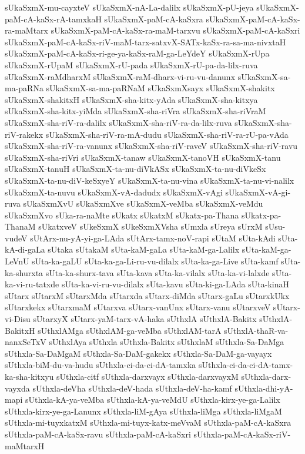 {sUkaSxmX-mu-cayxteV
sUkaSxmX-nA-La-dalilx
sUkaSxmX-pU-jeya
sUkaSxmX-paM-cA-kaSx-rA-tamxkaH
sUkaSxmX-paM-cA-kaSxra
sUkaSxmX-paM-cA-kaSx-ra-maMtarx
sUkaSxmX-paM-cA-kaSx-ra-maM-tarxvu
sUkaSxmX-paM-cA-kaSxri
sUkaSxmX-paM-cA-kaSx-riV-maM-tarx-satxvX-SATx-kaSx-ra-sa-ma-nivxtaH
sUkaSxmX-paM-cA-kaSx-ri-ge-ya-kaSx-raM-ga-LeYdeY
sUkaSxmX-rUpa
sUkaSxmX-rUpaM
sUkaSxmX-rU-pada
sUkaSxmX-rU-pa-da-lilx-ruva
sUkaSxmX-raMdharxM
sUkaSxmX-raM-dharx-vi-ru-vu-danunx
sUkaSxmX-sa-ma-paRNa
sUkaSxmX-sa-ma-paRNaM
sUkaSxmXsayx
sUkaSxmX-shakitx
sUkaSxmX-shakitxH
sUkaSxmX-sha-kitx-yAda
sUkaSxmX-sha-kitxya
sUkaSxmX-sha-kitx-yiMda
sUkaSxmX-sha-riVra
sUkaSxmX-sha-riVraM
sUkaSxmX-sha-riV-ra-dalilx
sUkaSxmX-sha-riV-ra-da-lilx-ruva
sUkaSxmX-sha-riV-rakekx
sUkaSxmX-sha-riV-ra-mA-dudu
sUkaSxmX-sha-riV-ra-rU-pa-vAda
sUkaSxmX-sha-riV-ra-vanunx
sUkaSxmX-sha-riV-raveV
sUkaSxmX-sha-riV-ravu
sUkaSxmX-sha-riVri
sUkaSxmX-tanaw
sUkaSxmX-tanoVH
sUkaSxmX-tanu
sUkaSxmX-tanuH
sUkaSxmX-ta-nu-diVkASx
sUkaSxmX-ta-nu-diVkeSx
sUkaSxmX-ta-nu-diV-keSxyeY
sUkaSxmX-ta-nu-vina
sUkaSxmX-ta-nu-vi-nalilx
sUkaSxmX-ta-nuvu
sUkaSxmX-vA-dadudx
sUkaSxmX-vAgi
sUkaSxmX-vA-gi-ruva
sUkaSxmXvU
sUkaSxmXve
sUkaSxmX-veMba
sUkaSxmX-veMdu
sUkaSxmXvo
sUka-ra-naMte
sUkatx
sUkatxM
sUkatx-pa-Thana
sUkatx-pa-ThanaM
sUkatxveV
sUkeSxmX
sUkeSxmXVsha
sUmxla
sUreya
sUrxM
sUsu-vudeV
sUtArx-nu-yA-yi-ga-LAda
sUtArx-tamx-noV-rapi
sUtaM
sUta-kAdi
sUta-kA-di-gaLa
sUtaka
sUtakaM
sUta-kaM-gaLa
sUta-kaM-ga-Lalilx
sUta-kaM-ga-LeVnU
sUta-ka-gaLU
sUta-ka-ga-Li-ru-vu-dilalx
sUta-ka-ga-Live
sUta-kamf
sUta-ka-shurxta
sUta-ka-shurx-tava
sUta-kava
sUta-ka-vilalx
sUta-ka-vi-lalxde
sUta-ka-vi-ru-tatxde
sUta-ka-vi-ru-vu-dilalx
sUta-kavu
sUta-ki-ga-LAda
sUta-kinaH
sUtarx
sUtarxM
sUtarxMda
sUtarxda
sUtarx-diMda
sUtarx-gaLu
sUtarxkUkx
sUtarxkekx
sUtarxmaM
sUtarxva
sUtarx-vanUnx
sUtarx-vanu
sUtarxveV
sUtarx-vi-Disu
sUtarxyX
sUtarx-yaM-tarx-vA-haka
sUthxlA
sUthxlA-Bakitx
sUthxlA-BakitxH
sUthxlAMga
sUthxlAM-ga-veMba
sUthxlAM-tarA
sUthxlA-thaR-va-nanxSeTxV
sUthxlAya
sUthxla
sUthxla-Bakitx
sUthxlaM
sUthxla-Sa-DaMga
sUthxla-Sa-DaMgaM
sUthxla-Sa-DaM-gakekx
sUthxla-Sa-DaM-ga-vayayx
sUthxla-biM-du-va-hudu
sUthxla-ci-da-ci-dA-tamxka
sUthxla-ci-da-ci-dA-tamx-ka-sha-kitxyu
sUthxla-citf
sUthxla-darxvayx
sUthxla-darxvayxM
sUthxla-darx-vayxda
sUthxla-deVha
sUthxla-deV-hada
sUthxla-deV-ha-kamf
sUthxla-dhi-yA-mapi
sUthxla-kA-ya-veMba
sUthxla-kA-ya-veMdU
sUthxla-kirx-ye-ga-Lalilx
sUthxla-kirx-ye-ga-Lanunx
sUthxla-liM-gAya
sUthxla-liMga
sUthxla-liMgaM
sUthxla-mi-tuyxkatxM
sUthxla-mi-tuyx-katx-meVvaM
sUthxla-paM-cA-kaSxra
sUthxla-paM-cA-kaSx-ravu
sUthxla-paM-cA-kaSxri
sUthxla-paM-cA-kaSx-riV-maMtarxH
}
